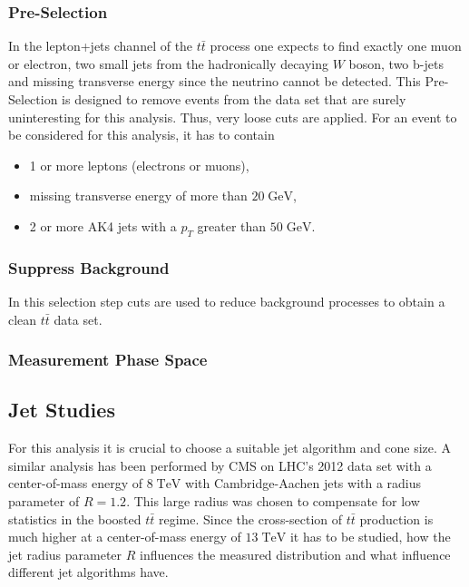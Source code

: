 \subsubsection{Pre-Selection}
\label{sssec:PreSel}
	In the lepton+jets channel of the $t\bar{t}$ process one expects to find exactly one muon or electron, two small jets from the hadronically decaying $W$ boson, two b-jets and missing transverse energy since the neutrino cannot be detected. This Pre-Selection is designed to remove events from the data set that are surely uninteresting for this analysis. Thus, very loose cuts are applied. For an event to be considered for this analysis, it has to contain
	\begin{itemize}
	\item 1 or more leptons (electrons or muons),
	\item missing transverse energy of more than $20\;\text{GeV}$,
	\item 2 or more AK4 jets with a $p_T$ greater than $50\;\text{GeV}$.
	\end{itemize}
	
\subsubsection{Suppress Background}
\label{sssec:BackSel}
	In this selection step cuts are used to reduce background processes to obtain a clean $t\bar{t}$ data set. 
\subsubsection{Measurement Phase Space}
\label{sssec:FinalSel}

	
	
\subsection{Jet Studies}
	For this analysis it is crucial to choose a suitable jet algorithm and cone size. A similar analysis has been performed by CMS on LHC's 2012 data set with a center-of-mass energy of $8\;\text{TeV}$ with Cambridge-Aachen jets with a radius parameter of $R=1.2$. This large radius was chosen to compensate for low statistics in the boosted $t\bar{t}$ regime. Since the cross-section of $t\bar{t}$ production is much higher at a center-of-mass energy of $13\;\text{TeV}$ it has to be studied, how the jet radius parameter $R$ influences the measured distribution and what influence different jet algorithms have.
